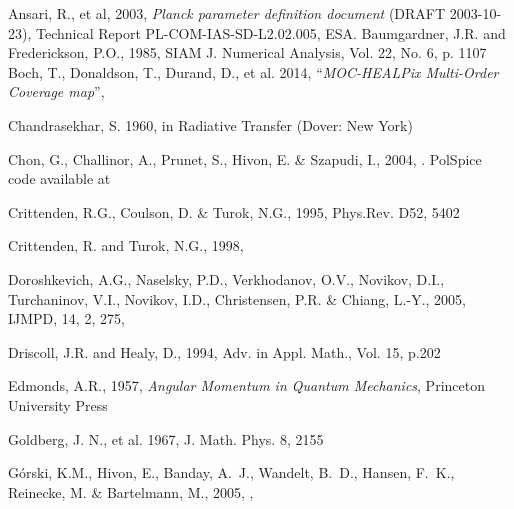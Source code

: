 \documentclass[12pt,twoside]{article}
\begin{document}

\begin{thebibliography}{99}
%

Ansari, R., et al, 2003, {\em Planck parameter definition document} (DRAFT
2003-10-23), Technical Report PL-COM-IAS-SD-L2.02.005, ESA.
%
Baumgardner, J.R. and Frederickson, P.O., 1985, SIAM J. Numerical Analysis, Vol. 22,
No. 6, p. 1107
%
Boch, T., Donaldson, T., Durand, D., et al. 2014, 
``{\em MOC-HEALPix Multi-Order Coverage map}'', 

Chandrasekhar, S. 1960, in Radiative Transfer (Dover: New York) 

Chon, G., Challinor, A., Prunet, S., Hivon, E. \& Szapudi, I., 2004, 
.
PolSpice code available at 



Crittenden, R.G., Coulson, D. \&  Turok, N.G., 1995, Phys.Rev. D52, 5402

Crittenden, R. and Turok, N.G., 1998, 

Doroshkevich, A.G.,
Naselsky,    P.D.,  
Verkhodanov, O.V.,  
Novikov,     D.I.,  
Turchaninov, V.I.,  
Novikov,     I.D.,  
Christensen, P.R. \&
Chiang,	     L.-Y., 2005,
IJMPD, 14, 2, 275, 

Driscoll, J.R. and Healy, D., 1994, Adv. in Appl. Math., Vol. 15, p.202

Edmonds, A.R., 1957, {\em Angular Momentum in Quantum Mechanics}, Princeton
University Press

Goldberg, J. N., et al. 1967, J. Math. Phys. 8, 2155

  G\'orski, K.M., Hivon, E., Banday, A.~J., Wandelt,
  B.~D., Hansen, F.~K., Reinecke, M. \& Bartelmann, M., 2005, 
, 


\end{thebibliography}
\end{document}
